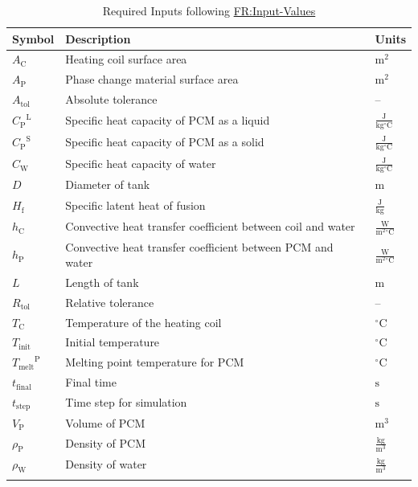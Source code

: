 \documentclass[12pt]{article}
\begin{document}
\begin{longtabu}{l X[l] l}
\toprule
\textbf{Symbol} & \textbf{Description} & \textbf{Units}
\\
\midrule
\endhead
${A_{\text{C}}}$ & Heating coil surface area & ${\text{m}^{2}}$
\\
${A_{\text{P}}}$ & Phase change material surface area & ${\text{m}^{2}}$
\\
${A_{\text{tol}}}$ & Absolute tolerance & --
\\
${{C_{\text{P}}}^{\text{L}}}$ & Specific heat capacity of PCM as a liquid & $\frac{\text{J}}{\text{kg}{}^{\circ}\text{C}}$
\\
${{C_{\text{P}}}^{\text{S}}}$ & Specific heat capacity of PCM as a solid & $\frac{\text{J}}{\text{kg}{}^{\circ}\text{C}}$
\\
${C_{\text{W}}}$ & Specific heat capacity of water & $\frac{\text{J}}{\text{kg}{}^{\circ}\text{C}}$
\\
$D$ & Diameter of tank & ${\text{m}}$
\\
${H_{\text{f}}}$ & Specific latent heat of fusion & $\frac{\text{J}}{\text{kg}}$
\\
${h_{\text{C}}}$ & Convective heat transfer coefficient between coil and water & $\frac{\text{W}}{\text{m}^{2}{}^{\circ}\text{C}}$
\\
${h_{\text{P}}}$ & Convective heat transfer coefficient between PCM and water & $\frac{\text{W}}{\text{m}^{2}{}^{\circ}\text{C}}$
\\
$L$ & Length of tank & ${\text{m}}$
\\
${R_{\text{tol}}}$ & Relative tolerance & --
\\
${T_{\text{C}}}$ & Temperature of the heating coil & ${{}^{\circ}\text{C}}$
\\
${T_{\text{init}}}$ & Initial temperature & ${{}^{\circ}\text{C}}$
\\
${{T_{\text{melt}}}^{\text{P}}}$ & Melting point temperature for PCM & ${{}^{\circ}\text{C}}$
\\
${t_{\text{final}}}$ & Final time & ${\text{s}}$
\\
${t_{\text{step}}}$ & Time step for simulation & ${\text{s}}$
\\
${V_{\text{P}}}$ & Volume of PCM & ${\text{m}^{3}}$
\\
${ρ_{\text{P}}}$ & Density of PCM & $\frac{\text{kg}}{\text{m}^{3}}$
\\
${ρ_{\text{W}}}$ & Density of water & $\frac{\text{kg}}{\text{m}^{3}}$
\\
\bottomrule
\caption{Required Inputs following \hyperref[inputValues]{FR:Input-Values}}
\label{Table:ReqInputs}
\end{longtabu}
\end{document}
